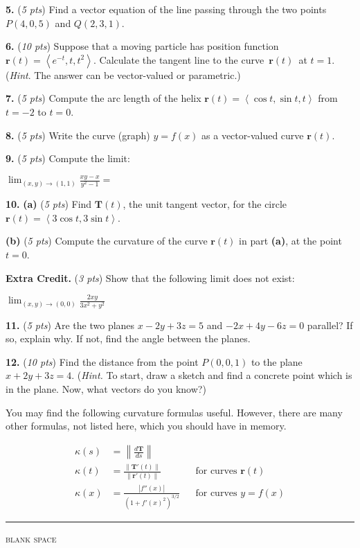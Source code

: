 \documentclass[11pt]{amsart}
\newcommand{\br}{\mathbf{r}}
\newcommand{\bT}{\mathbf{T}}
\newcommand{\ds}{\displaystyle}
\newcommand{\prob}[1]{\bigskip\noindent\textbf{#1.} }
\newcommand{\pts}[1]{(\emph{#1 pts})}
\newcommand{\probpts}[2]{\prob{#1} \pts{#2} \quad}
\newcommand{\ppartpts}[2]{\textbf{(#1)} \pts{#2} \quad}
\newcommand{\epartpts}[2]{\medskip\noindent \textbf{(#1)} \pts{#2} \quad}
\begin{document}
\clearpage\newpage
\probpts{5}{5}  Find a vector equation of the line passing through the two points $P(4,0,5)$ and $Q(2,3,1)$.  %
\vfill

\probpts{6}{10}  Suppose that a moving particle has position function {\large\, $\br(t) = \left<e^{-t},t,t^2\right>$}.  Calculate the tangent line to the curve {\large \,$\br(t)$\,} at {\large $t=1$}.  (\emph{Hint}.  The answer can be vector-valued or parametric.)
\vfill


\clearpage\newpage
\probpts{7}{5} Compute the arc length of the helix $\br(t) = \left<\cos t,\sin t,t\right>$ from $t=-2$ to $t=0$.
\vfill

\probpts{8}{5}  Write the curve (graph) $y=f(x)$ as a vector-valued curve $\br(t)$.
\vspace{2.5in}

\probpts{9}{5}  Compute the limit:

$\ds \lim_{(x,y)\to (1,1)} \frac{xy - x}{y^2 - 1} =$
\vspace{2.5in}


\clearpage\newpage
\prob{10}  \ppartpts{a}{5}  Find $\bT(t)$, the unit tangent vector, for the circle $\br(t) = \left<3\cos t,3\sin t\right>$.
\vfill

\epartpts{b}{5}  Compute the curvature of the curve $\br(t)$ in part \textbf{(a)}, at the point $t=0$.
\vfill

\probpts{Extra Credit}{3}  Show that the following limit does not exist:

\bigskip
$\ds \lim_{(x,y) \to (0,0)} \frac{2 x y}{3x^2 + y^2}$
\vspace{2.0in}

\clearpage\newpage
\probpts{11}{5}  Are the two planes $x - 2 y + 3 z = 5$ and $- 2 x + 4 y - 6 z = 0$ parallel?  If so, explain why.  If not, find the angle between the planes.
\vfill

\probpts{12}{10}  Find the distance from the point $P(0,0,1)$ to the plane $x+2y+3z=4$.  (\emph{Hint.}  To start, draw a sketch and find a concrete point which is in the plane.  Now, what vectors do you know?)
\vfill

\clearpage\newpage
\noindent You may find the following curvature formulas useful.  However, there are many other formulas, not listed here, which you should have in memory.

\begin{align*}
\kappa(s) &= \left\|\frac{d\bT}{ds}\right\| \\
\kappa(t) &= \frac{\|\bT'(t)\|}{\|\br'(t)\|} &&\text{for curves $\br(t)$} \\
\kappa(x) &= \frac{|f''(x)|}{\left(1+f'(x)^2\right)^{3/2}} &&\text{for curves $y=f(x)$}
\end{align*}

\bigskip
\noindent \hrule
\begin{center}
\small
\bigskip
\textsc{blank space}
\end{center}
\vfill
\end{document}
